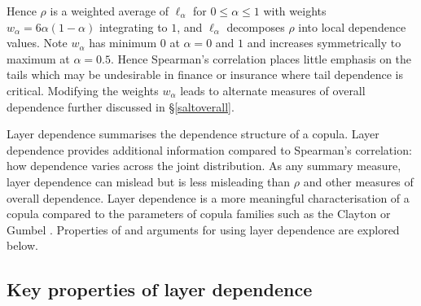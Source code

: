 \documentclass[authoryear]{elsarticle}
\newcommand{\sref}[1]{\S\ref{#1}}
\begin{document}
Hence $\rho$ is a weighted average of $\ell_\alpha$ for $0\le\alpha\le 1$ with weights $w_\alpha=6\alpha(1-\alpha)$ integrating to $1$, and $\ell_\alpha$ decomposes $\rho$ into local dependence values. Note $w_\alpha$ has minimum $0$ at $\alpha=0$ and $1$ and increases symmetrically to maximum at $\alpha=0.5$. Hence Spearman's correlation places little emphasis on the tails which may be undesirable in finance or insurance where tail dependence is critical. Modifying the weights $w_\alpha$ leads to alternate measures of overall dependence further discussed in \sref{saltoverall}.

Layer dependence summarises the dependence structure of a copula. Layer dependence provides additional information compared to Spearman's correlation: how dependence varies across the joint distribution. As  any summary measure, layer dependence can mislead but is less misleading than $\rho$ and other measures of overall dependence. Layer dependence is  a more meaningful characterisation of a copula compared to the parameters of copula families such as the Clayton or Gumbel \citep{mcneil2005qrm}. Properties of and arguments for using layer dependence are explored below.

\subsection{Key properties of layer dependence}

\end{document}
